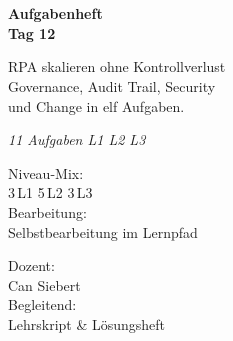 \documentclass[11pt,a4paper,oneside]{article}
\newcommand{\caveatfontfallback}{\itshape}
\newcommand\caveatfont{\caveatfontfallback}%
\begin{document}
\begin{titlepage}
  \pagestyle{empty}
  \vspace*{1.5cm}
  \\[2pt]
  \noindent{\color{lpAccent}\rule{\linewidth}{1.2pt}}\\[4pt]

  \vspace{3cm}
  {\sffamily\fontsize{30}{34}\selectfont\bfseries\color{lpInk}Aufgabenheft\\Tag 12\par}

  \vspace{0.7cm}
  {\sffamily\large\color{lpGray}RPA skalieren ohne Kontroll\-verlust \textendash{}\\Governance, Audit Trail, Security\\und Change in elf Aufgaben.\par}

  \vspace{1.5cm}
  {\caveatfont\LARGE\color{lpAmber}11 Aufgaben \textperiodcentered{} L1 \textperiodcentered{} L2 \textperiodcentered{} L3}\par

  \vfill

  \noindent\begin{minipage}{0.55\linewidth}
    {\sffamily\footnotesize\color{lpGray}Niveau-Mix:}\\
    {\sffamily\small\color{lpInk}3\,\textsf{L1} \textperiodcentered{} 5\,\textsf{L2} \textperiodcentered{} 3\,\textsf{L3}}\\[10pt]
    {\sffamily\footnotesize\color{lpGray}Bearbeitung:}\\
    {\sffamily\small\color{lpInk}Selbstbearbeitung im Lernpfad}
  \end{minipage}\hfill
  \begin{minipage}{0.4\linewidth}
    \raggedleft
    {\sffamily\footnotesize\color{lpGray}Dozent:}\\
    {\sffamily\small\color{lpInk}Can Siebert}\\[10pt]
    {\sffamily\footnotesize\color{lpGray}Begleitend:}\\
    {\sffamily\small\color{lpInk}Lehrskript \& L\"osungsheft}
  \end{minipage}

  \vspace{0.5cm}
  \noindent{\color{lpAccent}\rule{\linewidth}{0.6pt}}
\end{titlepage}
\end{document}
